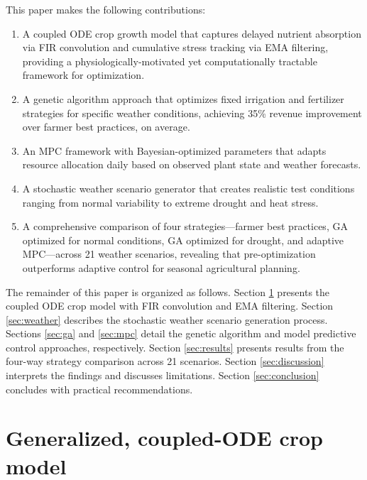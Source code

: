 \documentclass[preprint,12pt]{elsarticle}
\begin{document}
This paper makes the following contributions:
\begin{enumerate}
\item A coupled ODE crop growth model that captures delayed nutrient absorption via FIR convolution and cumulative stress tracking via EMA filtering, providing a physiologically-motivated yet computationally tractable framework for optimization.
\item A genetic algorithm approach that optimizes fixed irrigation and fertilizer strategies for specific weather conditions, achieving 35\% revenue improvement over farmer best practices, on average.
\item An MPC framework with Bayesian-optimized parameters that adapts resource allocation daily based on observed plant state and weather forecasts.
\item A stochastic weather scenario generator that creates realistic test conditions ranging from normal variability to extreme drought and heat stress.
\item A comprehensive comparison of four strategies---farmer best practices, GA optimized for normal conditions, GA optimized for drought, and adaptive MPC---across 21 weather scenarios, revealing that pre-optimization outperforms adaptive control for seasonal agricultural planning.
\end{enumerate}

The remainder of this paper is organized as follows. Section \ref{sec:modeling} presents the coupled ODE crop model with FIR convolution and EMA filtering. Section \ref{sec:weather} describes the stochastic weather scenario generation process. Sections \ref{sec:ga} and \ref{sec:mpc} detail the genetic algorithm and model predictive control approaches, respectively. Section \ref{sec:results} presents results from the four-way strategy comparison across 21 scenarios. Section \ref{sec:discussion} interprets the findings and discusses limitations. Section \ref{sec:conclusion} concludes with practical recommendations.

\section{Generalized, coupled-ODE crop model}\label{sec:modeling}
\end{document}
